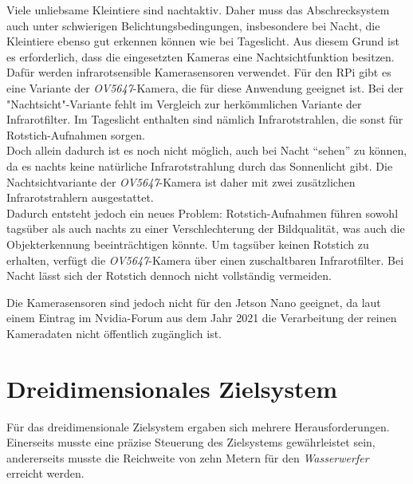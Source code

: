 Viele unliebsame Kleintiere sind nachtaktiv. Daher muss das Abschrecksystem auch unter schwierigen Belichtungsbedingungen, insbesondere bei Nacht, die Kleintiere ebenso gut erkennen können wie bei Tageslicht. Aus diesem Grund ist es erforderlich, dass die eingesetzten Kameras eine Nachtsichtfunktion besitzen. Dafür werden infrarotsensible Kamerasensoren verwendet. Für den \acl{RPi} gibt es eine Variante der \textit{OV5647}-Kamera, die für diese Anwendung geeignet ist. Bei der "Nachtsicht"-Variante fehlt im Vergleich zur herkömmlichen Variante der Infrarotfilter. Im Tageslicht enthalten sind nämlich Infrarotstrahlen, die sonst für Rotstich-Aufnahmen sorgen. 
\\
Doch allein dadurch ist es noch nicht möglich, auch bei Nacht "`sehen"' zu können, da es nachts keine natürliche Infrarotstrahlung durch das Sonnenlicht gibt. Die Nachtsichtvariante der \textit{OV5647}-Kamera ist daher mit zwei zusätzlichen Infrarotstrahlern ausgestattet.
\\
Dadurch entsteht jedoch ein neues Problem: Rotstich-Aufnahmen führen sowohl tagsüber als auch nachts zu einer Verschlechterung der Bildqualität, was auch die Objekterkennung beeinträchtigen könnte. Um tagsüber keinen Rotstich zu erhalten, verfügt die \textit{OV5647}-Kamera über einen zuschaltbaren Infrarotfilter. Bei Nacht lässt sich der Rotstich dennoch nicht vollständig vermeiden. \cite{ov_5647}

Die Kamerasensoren sind jedoch nicht für den Jetson Nano geeignet, da laut einem Eintrag im Nvidia-Forum aus dem Jahr 2021 die Verarbeitung der reinen Kameradaten nicht öffentlich zugänglich ist. \cite{nvidia_forum_2021_nvidia}
\\


\section{Dreidimensionales Zielsystem} \label{cap:dreidim}

Für das dreidimensionale Zielsystem ergaben sich mehrere Herausforderungen. Einerseits musste eine präzise Steuerung des Zielsystems gewährleistet sein, andererseits musste die Reichweite von zehn Metern für den \textit{Wasserwerfer} erreicht werden.

